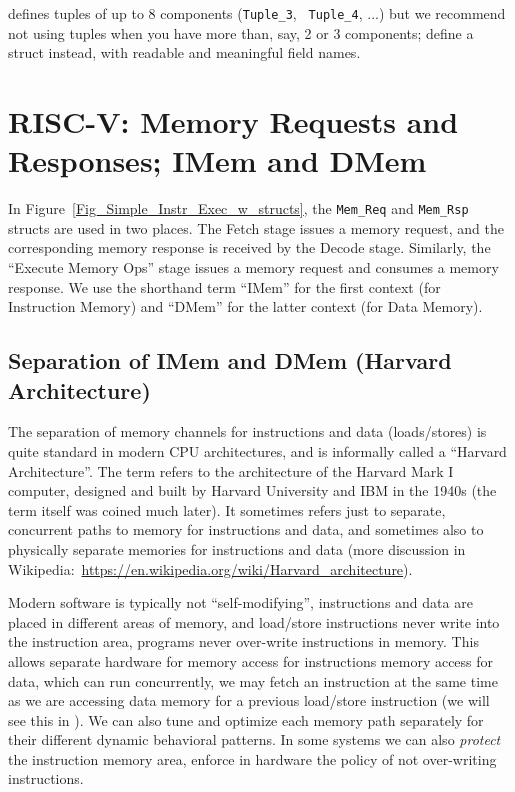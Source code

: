 {\BSV} defines tuples of up to 8 components ({\tt Tuple\_3}, {\tt
Tuple\_4}, ...) but we recommend not using tuples when you have more
than, say, 2 or 3 components; define a struct instead, with readable
and meaningful field names.


\section{RISC-V: Memory Requests and Responses; IMem and DMem}


In Figure~\ref{Fig_Simple_Instr_Exec_w_structs}, the \verb|Mem_Req|
and \verb|Mem_Rsp| structs are used in two places.  The Fetch stage
issues a memory request, and the corresponding memory response is
received by the Decode stage.  Similarly, the ``Execute Memory Ops''
stage issues a memory request and consumes a memory response.  We use
the shorthand term ``IMem'' for the first context (for Instruction
Memory) and ``DMem'' for the latter context (for Data Memory).


\subsection{Separation of IMem and DMem (Harvard Architecture)}

\label{Sec_Harvard_architecture}


The separation of memory channels for instructions and data
(loads/stores) is quite standard in modern CPU architectures, and is
informally called a ``Harvard Architecture''.  The term refers to the
architecture of the Harvard Mark I computer, designed and built by
Harvard University and IBM in the 1940s (the term itself was coined
much later).  It sometimes refers just to separate, concurrent paths
to memory for instructions and data, and sometimes also to physically
separate memories for instructions and data (more discussion in
Wikipedia:~\url{https://en.wikipedia.org/wiki/Harvard_architecture}).

Modern software is typically not ``self-modifying'', {\ie}
instructions and data are placed in different areas of memory, and
load/store instructions never write into the instruction area, {\ie}
programs never over-write instructions in memory.  This allows
separate hardware for memory access for instructions {\vs} memory
access for data, which can run concurrently, {\ie} we may fetch an
instruction at the same time as we are accessing data memory for a
previous load/store instruction (we will see this in {\FIFE}).  We can
also tune and optimize each memory path separately for their different
dynamic behavioral patterns.  In some systems we can also
\emph{protect} the instruction memory area, {\ie} enforce in hardware
the policy of not over-writing instructions.

